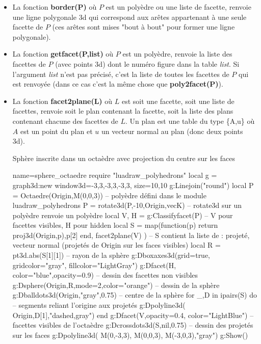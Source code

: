 \begin{itemize}
    \item La fonction \textbf{border(P)} où $P$ est un polyèdre ou une liste de facette, renvoie une ligne polygonale 3d qui correspond aux arêtes appartenant à une seule facette de $P$ (ces arêtes sont mises "bout à bout" pour former une ligne polygonale).
    
    \item La fonction \textbf{getfacet(P,list)} où $P$ est un polyèdre, renvoie la liste des facettes de $P$ (avec points 3d) dont le numéro figure dans la table \emph{list}. Si l'argument \emph{list} n'est pas précisé, c'est la liste de toutes les facettes de $P$ qui est renvoyée (dans ce cas c'est la même chose que \textbf{poly2facet(P)}).
    
    \item La fonction \textbf{facet2plane(L)} où $L$ est soit une facette, soit une liste de facettes, renvoie soit le plan contenant la facette, soit la liste des plans contenant chacune des facettes de $L$. Un plan est une table du type \{A,u\} où $A$ est un point du plan et $u$ un vecteur normal au plan (donc deux points 3d).
    
\begin{demo}{Sphère inscrite dans un octaèdre avec projection du centre sur les faces}
\begin{luadraw}{name=sphere_octaedre}
require "luadraw_polyhedrons"
local g = graph3d:new{ window3d={-3,3,-3,3,-3,3}, size={10,10}}
g:Linejoin("round")
local P = Octaedre(Origin,M(0,0,3)) -- polyèdre défini dans le module luadraw_polyhedrons
P = rotate3d(P,-10,{Origin,vecK}) -- rotate3d sur un polyèdre renvoie un polyèdre
local V, H = g:Classifyfacet(P) -- V pour facettes visibles, H pour hidden
local S = map(function(p) return {proj3d(Origin,p),p[2]} end, facet2plane(V) )
-- S contient la liste de : {projeté, vecteur normal} (projetés de Origin sur les faces visibles)
local R = pt3d.abs(S[1][1]) -- rayon de la sphère
g:Dboxaxes3d({grid=true, gridcolor="gray", fillcolor="LightGray"})
g:Dfacet(H, {color="blue",opacity=0.9}) -- dessin des facettes non visibles
g:Dsphere(Origin,R,{mode=2,color="orange"}) -- dessin de la sphère
g:Dballdots3d(Origin,"gray",0.75) -- centre de la sphère
for _,D in ipairs(S) do -- segments reliant l'origine aux projetés
    g:Dpolyline3d( {Origin,D[1]},"dashed,gray")
end
g:Dfacet(V,{opacity=0.4, color="LightBlue"}) -- facettes visibles de l'octaèdre
g:Dcrossdots3d(S,nil,0.75) -- dessin des projetés sur les faces
g:Dpolyline3d( {M(0,-3,3), M(0,0,3), M(-3,0,3)},"gray")
g:Show()            
\end{luadraw}
\end{demo}
\end{itemize}

